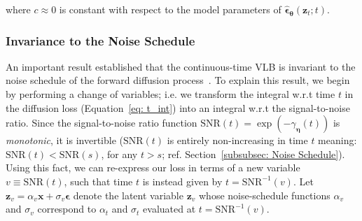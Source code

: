 %
where $c \approx 0 $ is constant with respect to the model parameters of $\hat{\boldsymbol{\epsilon}}_{\boldsymbol{\theta}}(\mathbf{z}_t;t)$.
%
\subsubsection{Invariance to the Noise Schedule}
\label{subsubsec: Invariance to the Noise Schedule}
%
An important result established that the continuous-time VLB is invariant to the noise schedule of the forward diffusion process~\citep{kingma2021variational}. To explain this result, we begin by performing a change of variables; i.e. we transform the integral w.r.t time $t$ in the diffusion loss (Equation~\ref{eq: t_int}) into an integral w.r.t the signal-to-noise ratio. Since the signal-to-noise ratio function $\mathrm{SNR}(t)= \exp(-\gamma_{\boldsymbol{\eta}}(t))$ is \textit{monotonic}, it is invertible ($\mathrm{SNR}(t)$ is entirely non-increasing in time $t$ meaning: $\mathrm{SNR}(t) < \mathrm{SNR}(s)$, for any $t>s$; ref. Section~\ref{subsubsec: Noise Schedule}). Using this fact, we can re-express our loss in terms of a new variable $v \equiv \mathrm{SNR}(t)$, such that time $t$ is instead given by $t = \mathrm{SNR}^{-1}(v)$. Let $\mathbf{z}_v = \alpha_v \mathbf{x} + \sigma_v \boldsymbol{\epsilon}$ denote the latent variable $\mathbf{z}_v$ whose noise-schedule functions $\alpha_v$ and $\sigma_v$ correspond to $\alpha_t$ and $\sigma_t$ evaluated at $t = \mathrm{SNR}^{-1}(v)$. 

